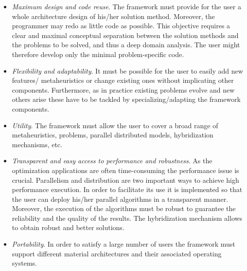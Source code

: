 \begin{itemize}
\item {\em Maximum design and code reuse\/}. The framework must provide for the user a whole architecture design of his/her solution method. Moreover, the programmer may redo as little code as possible. This objective requires a clear and maximal conceptual separation between the solution methods and the problems to be solved, and thus a deep domain analysis. The user might therefore develop only the minimal problem-specific code.

\item {\em Flexibility and adaptability\/}. It must be possible for the user to easily add new features/ metaheuristics or change existing ones without implicating other components. Furthermore, as in practice existing problems evolve and new others arise these have to be tackled by specializing/adapting the framework components.

\item {\em Utility\/}. The framework must allow the user to cover a broad range of metaheuristics, problems, parallel distributed models, hybridization mechanisms, etc.

\item {\em Transparent and easy access to performance and robustness\/}. As the optimization applications are often time-consuming the performance issue is crucial. Parallelism and distribution are two important ways to achieve high performance execution. In order to facilitate its use it is implemented so that the user can deploy his/her parallel algorithms in a transparent manner. Moreover, the execution of the algorithms must be robust to guarantee the reliability and the quality of the results. The hybridization mechanism allows to obtain robust and better solutions.

\item {\em Portability\/}. In order to satisfy a large number of users the framework must support different material architectures and their associated operating systems. \end{itemize}
